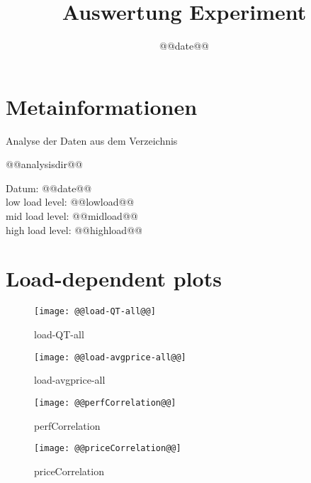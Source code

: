 \documentclass[11pt]{article}
\title{\textsf{Auswertung Experiment}}
\date{@@date@@}
\begin{document}
{}

\maketitle

\section{Metainformationen}
Analyse der Daten aus dem Verzeichnis 
\begin{center}
@@analysisdir@@ 
\end{center}
Datum: @@date@@ \\
low load level: @@lowload@@ \\
mid load level: @@midload@@ \\
high load level: @@highload@@ \\

\newpage
\section{Load-dependent plots}

\begin{figure}[htbp]
  \begin{center}
    \texttt{[image: @@load-QT-all@@]}
    \caption{load-QT-all}
    \label{fig:load-QT-all}
  \end{center}
\end{figure}

\begin{figure}[htbp]
  \begin{center}
    \texttt{[image: @@load-avgprice-all@@]}
    \caption{load-avgprice-all}
    \label{fig:load-avgprice-all}
  \end{center}
\end{figure}

\begin{figure}[htbp]
  \begin{center}
    \texttt{[image: @@perfCorrelation@@]}
    \caption{perfCorrelation}
    \label{fig:perfCorrelation}
  \end{center}
\end{figure}

\begin{figure}[htbp]
  \begin{center}
    \texttt{[image: @@priceCorrelation@@]}
    \caption{priceCorrelation}
    \label{fig:priceCorrelation}
  \end{center}
\end{figure}
\end{document}
